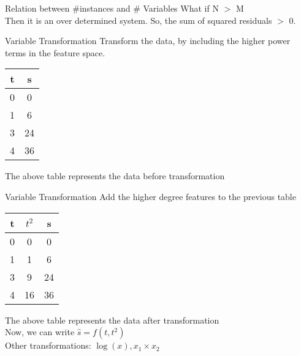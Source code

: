 \documentclass{beamer}
\begin{document}
\begin{frame}{Relation between \#instances and \# Variables}
   What if N $>$ M\\
   \pause   Then it is an over determined system. So, the sum of squared residuals $>$ 0.
\end{frame}



\begin{frame}{Variable Transformation}
    Transform the data, by including the higher power terms in the feature space. 
    
       
    \begin{center}
 \begin{tabular}{||c c||} 
 \hline
 t  & s \\ [0.5ex] 
 \hline\hline
 0 & 0 \\
 1 & 6 \\
 3 & 24 \\
 4 & 36 \\
 \hline
\end{tabular}
\end{center}

The above table represents the data before transformation
\end{frame}


\begin{frame}{Variable Transformation}
Add the higher degree features to the previous table
    
       
    \begin{center}
 \begin{tabular}{||c c c||} 
 \hline
 t  & $t^{2}$ & s \\ [0.5ex] 
 \hline\hline
 0 & 0&0 \\
 1 & 1&6 \\
 3 & 9&24 \\
 4 & 16&36 \\
 \hline
\end{tabular}
\end{center}

\pause The above table represents the data after transformation \\
\pause Now, we can write $\hat{s}=f(t, t^2)$ \\
\pause Other transformations: $\log(x), x_1\times x_2$
\end{frame}
\end{document}
